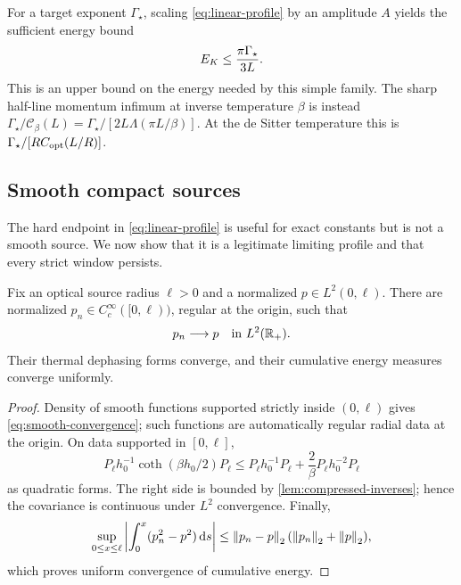For a target exponent $\Gamma_\star$, scaling
\cref{eq:linear-profile} by an amplitude $A$ yields the sufficient energy
bound
\begin{equation}
 E_{K}\leq\frac{\pi\Gamma_\star}{3L}.
 \label{eq:constructive-energy}
\end{equation}
This is an upper bound on the energy needed by this simple family.  The sharp
half-line momentum infimum at inverse temperature $\beta$ is instead
$\Gamma_\star/\mathcal C_\beta(L)
=\Gamma_\star/[2L\Lambda(\pi L/\beta)]$.  At the de Sitter temperature this
is $\Gamma_\star/[R C_{\rm opt}(L/R)]$.

\subsection{Smooth compact sources}

The hard endpoint in \cref{eq:linear-profile} is useful for exact constants
but is not a smooth source.  We now show that it is a legitimate limiting
profile and that every strict window persists.

\begin{lemma}
\label{lem:smooth-density}
Fix an optical source radius $\ell>0$ and a normalized
$p\in L^2(0,\ell)$.  There are normalized
$p_n\in C_c^\infty([0,\ell))$, regular at the origin, such that
\begin{equation}
 p_n\longrightarrow p
 \quad\hbox{in }L^2(\mathbb R_+).
 \label{eq:smooth-convergence}
\end{equation}
Their thermal dephasing forms converge, and their cumulative energy measures
converge uniformly.
\end{lemma}

\begin{proof}
Density of smooth functions supported strictly inside $(0,\ell)$ gives
\cref{eq:smooth-convergence}; such functions are automatically regular radial
data at the origin.  On data supported in $[0,\ell]$,
\begin{equation}
 P_\ell h_0^{-1}\coth(\beta h_0/2)P_\ell
 \leq P_\ell h_0^{-1}P_\ell
 +\frac2\beta P_\ell h_0^{-2}P_\ell
 \label{eq:thermal-compressed-bound}
\end{equation}
as quadratic forms.  The right side is bounded by
\cref{lem:compressed-inverses}; hence the covariance is continuous under
$L^2$ convergence.  Finally,
\begin{equation}
 \sup_{0\leq x\leq\ell}
 \left|\int_0^x(p_n^2-p^2)\,\mathrm d s\right|
 \leq\left\lVert p_n-p\right\rVert_2(\left\lVert p_n\right\rVert_2+\left\lVert p\right\rVert_2),
 \label{eq:mass-uniform-convergence}
\end{equation}
which proves uniform convergence of cumulative energy.
\end{proof}

